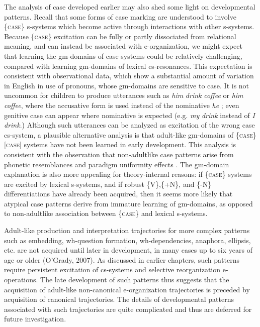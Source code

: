   The analysis of case developed earlier may also shed some light on developmental patterns. Recall that some forms of case marking are understood to involve \{\textsc{case}\} s-systems which become active through interactions with other s-systems. Because \{\textsc{case}\} excitation can be fully or partly dissociated from relational meaning, and can instead be associated with e-organization, we might expect that learning the gm-domains of case systems could be relatively challenging, compared with learning gm-domains of lexical cs-resonances. This expectation is consistent with observational data, which show a substantial amount of variation in English in use of pronouns, whose gm-domains are sensitive to case. It is not uncommon for children to produce utterances such as \textit{him} \textit{drink} \textit{coffee} or \textit{him} \textit{coffee}, where the accusative form is used instead of the nominative \textit{he} \citep{Radford1990}; even genitive case can appear where nominative is expected (e.g. \textit{my} \textit{drink} instead of \textit{I} \textit{drink}.) Although such utterances can be analyzed as excitation of the wrong case cs-system, a plausible alternative analysis is that adult-like gm-domains of \{\textsc{case}\}[\textsc{case}] systems have not been learned in early development. This analysis is consistent with the observation that non-adultlike case patterns arise from phonetic resemblances and paradigm uniformity effects \citep{Rispoli1994}. The gm-domain explanation is also more appealing for theory-internal reasons: if \{\textsc{case}\} systems are excited by lexical s-systems, and if robust \{V\},\{+N\}, and \{-N\} differentiations have already been acquired, then it seems more likely that atypical case patterns derive from immature learning of gm-domains, as opposed to non-adultlike association between \{\textsc{case}\} and lexical s-systems. 

  Adult-like production and interpretation trajectories for more complex patterns such as embedding, wh-question formation, wh-dependencies, anaphora, ellipsis, etc. are not acquired until later in development, in many cases up to six years of age or older (O’Grady, 2007). As discussed in earlier chapters, such patterns require persistent excitation of cs-systems and selective reorganization e-operations. The late development of such patterns thus suggests that the acquisition of adult-like non-canonical e-organization trajectories is preceded by acquisition of canonical trajectories. The details of developmental patterns associated with such trajectories are quite complicated and thus are deferred for future investigation.

